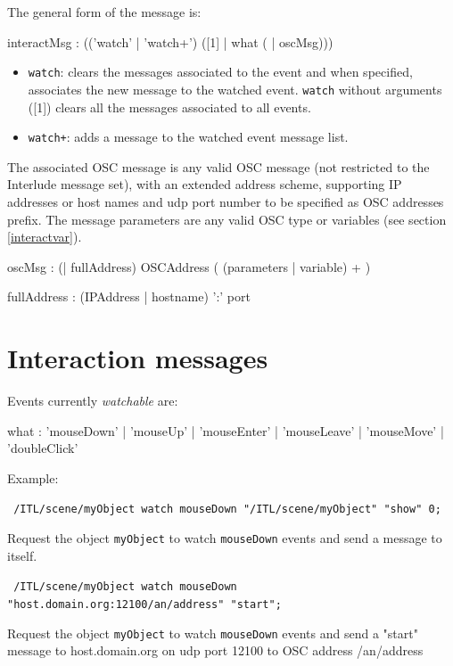 \documentclass[a4paper,twoside]{report}
\newcommand{\sublevel}[1]	{\section{#1}}
\newcommand{\OSC}[1]		{\texttt{#1}}
\newcommand{\sample}	[1]			{\begin{center}\colorbox{mygrey}{
								\begin{minipage}[t]{0.9\columnwidth} 
								{\small \texttt{#1}}
								\end{minipage}}\end{center}}
\begin{document}
The general form of the message is:

\begin{rail}
interactMsg : (('watch' | 'watch+')  ([1] | what  ( | oscMsg))) 
\end{rail}

\begin{itemize}
\item \OSC{watch}: clears the messages associated to the event and when specified, associates the new message to the watched event. \OSC{watch} without arguments ([1]) clears all the messages associated to all events.
\item \OSC{watch+}: adds a message to the watched event message list. 
\end{itemize}

The associated OSC message is any valid OSC message (not restricted to the Interlude message set), with an extended address scheme, supporting IP addresses or host names and udp port number to be specified as OSC addresses prefix. The message parameters are any valid OSC type or variables (see section \ref{interactvar}).
\begin{rail} 
oscMsg : (| fullAddress)  OSCAddress ( (parameters | variable) + )
\end{rail}

\begin{rail} 
fullAddress : (IPAddress | hostname) ':' port
\end{rail}


\sublevel{Interaction messages}
\label{interactmsg}

Events currently \emph{watchable} are:
\begin{rail}
what : 'mouseDown' | 'mouseUp' | 'mouseEnter' | 'mouseLeave' | 'mouseMove' | 'doubleClick' 
\end{rail}


Example:
\sample{
/ITL/scene/myObject watch mouseDown "/ITL/scene/myObject" "show" 0;
}
Request the object \OSC{myObject} to watch \OSC{mouseDown} events and send a message to itself.
\sample{
/ITL/scene/myObject watch mouseDown "host.domain.org:12100/an/address" "start";
}
Request the object \OSC{myObject} to watch \OSC{mouseDown} events and send a "start" message to host.domain.org on udp port 12100 to OSC address /an/address
\end{document}
